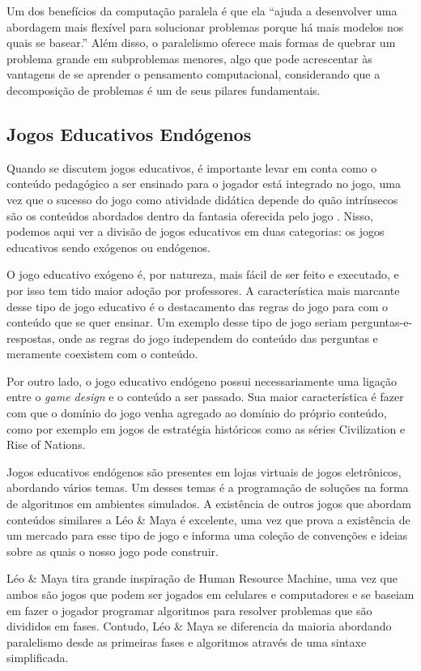 \documentclass[conference]{IEEEtran}
\begin{document}
Um dos benefícios da computação paralela é que ela ``ajuda a desenvolver uma abordagem mais flexível para solucionar problemas porque há mais modelos nos quais se basear.''\cite{b5} Além disso, o paralelismo oferece mais formas de quebrar um problema grande em subproblemas menores, algo que pode acrescentar às vantagens de se aprender o pensamento computacional, considerando que a decomposição de problemas é um de seus pilares fundamentais\cite{b5}.

\subsection{Jogos Educativos Endógenos}

Quando se discutem jogos educativos, é importante levar em conta como o conteúdo pedagógico a ser ensinado para o jogador está integrado no jogo, uma vez que o sucesso do jogo como atividade didática depende do quão intrínsecos são os conteúdos abordados dentro da fantasia oferecida pelo jogo \cite{b13}. Nisso, podemos aqui ver a divisão de jogos educativos em duas categorias: os jogos educativos sendo exógenos ou endógenos\cite{b14}.

O jogo educativo exógeno é, por natureza, mais fácil de ser feito e executado, e por isso tem tido maior adoção por professores.\cite{b14} A característica mais marcante desse tipo de jogo educativo é o destacamento das regras do jogo para com o conteúdo que se quer ensinar.  Um exemplo desse tipo de jogo seriam perguntas-e-respostas, onde as regras do jogo independem do conteúdo das perguntas e meramente coexistem com o conteúdo.

Por outro lado, o jogo educativo endógeno possui necessariamente uma ligação entre o \textit{game design} e o conteúdo a ser passado. Sua maior característica é fazer com que o domínio do jogo venha agregado ao domínio do próprio conteúdo, como por exemplo em jogos de estratégia históricos como as séries Civilization e Rise of Nations\cite{b14}.

Jogos educativos endógenos são presentes em lojas virtuais de jogos eletrônicos, abordando vários temas. Um desses temas é a programação de soluções na forma de algoritmos em ambientes simulados\cite{b15}\cite{b16}\cite{b17}. A existência de outros jogos que abordam conteúdos similares a Léo \& Maya é excelente, uma vez que prova a existência de um mercado para esse tipo de jogo e informa uma coleção de convenções e ideias sobre as quais o nosso jogo pode construir.

Léo \& Maya tira grande inspiração de Human Resource Machine\cite{b18}, uma vez que ambos são jogos que podem ser jogados em celulares e computadores e se baseiam em fazer o jogador programar algoritmos para resolver problemas que são divididos em fases. Contudo, Léo \& Maya se diferencia da maioria abordando paralelismo desde as primeiras fases e algoritmos através de uma sintaxe simplificada.
\end{document}
